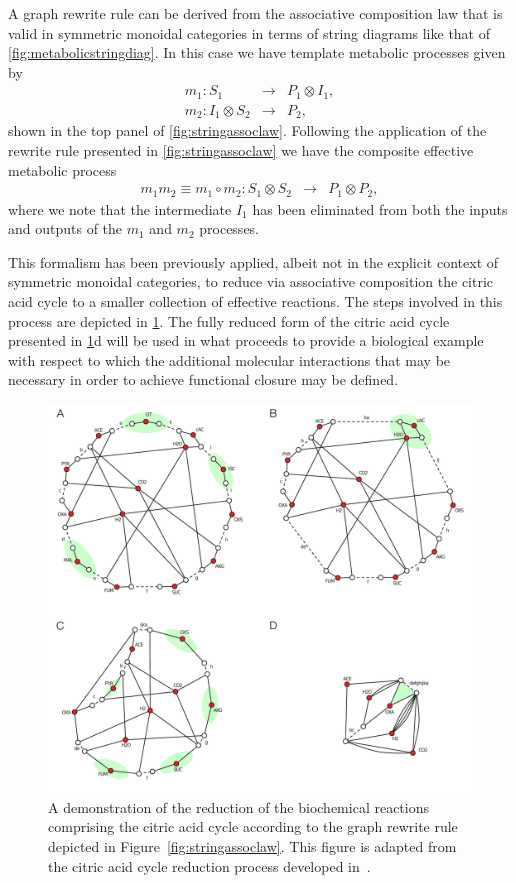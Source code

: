 \documentclass[10pt]{article}
\theoremstyle{plain}
\theoremstyle{definition}
\theoremstyle{remark}
\begin{document}
A graph rewrite rule can be derived from the associative composition law that is valid in symmetric monoidal categories in terms of string diagrams like that of \ref{fig:metabolicstringdiag}. In this case we have template metabolic processes given by
\begin{eqnarray*}
m_1 \colon S_1 &\longrightarrow& P_1 \otimes I_1,\\
m_2 \colon I_1 \otimes S_2 &\longrightarrow& P_2,
\end{eqnarray*}
shown in the top panel of \ref{fig:stringassoclaw}. Following the application of the rewrite rule presented in \ref{fig:stringassoclaw} we have the composite effective metabolic process
\begin{eqnarray*}
m_{1}m_{2} \equiv m_1 \circ m_2 \colon S_1 \otimes S_2 &\longrightarrow& P_1 \otimes P_2,
\end{eqnarray*}
where we note that the intermediate $I_1$ has been eliminated from both the inputs and outputs of the $m_1$ and $m_2$ processes.

This formalism has been previously applied, albeit not in the explicit context of symmetric monoidal categories, to reduce via associative composition the citric acid cycle to a smaller collection of effective reactions. The steps involved in this process are depicted in \ref{fig:ctacycred}. The fully reduced form of the citric acid cycle presented in \ref{fig:ctacycred}d will be used in what proceeds to provide a biological example with respect to which the additional molecular interactions that may be necessary in order to achieve functional closure may be defined.

\begin{figure}
\begin{center}
\noindent\includegraphics[width=0.9\columnwidth]{fig/rTCA-reduction.pdf}
\end{center}
\caption[TCA reduction]{A demonstration of the reduction of the biochemical reactions comprising the citric acid cycle according to the graph rewrite rule depicted in Figure~\ref{fig:stringassoclaw}. This figure is adapted from the citric acid cycle reduction process developed in~\cite{Braakman2012a}.}
\label{fig:ctacycred}
\end{figure}
\end{document}
